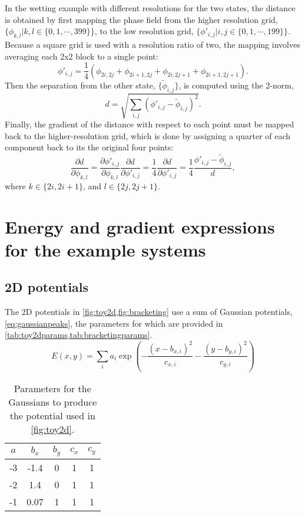 \documentclass[aip,jcp,reprint,twocolumn]{revtex4-1}
\begin{document}
In the wetting example with different resolutions for the two states, the distance is obtained by first mapping the phase field from the higher resolution grid, $\{\phi_{k,l} | k,l \in \{0,1,\cdots,399\}\}$, to the low resolution grid, $\{\phi'_{i,j} | i,j \in \{0,1,\cdots,199\}\}$.
Because a square grid is used with a resolution ratio of two, the mapping involves averaging each 2x2 block to a single point:
\begin{equation}
  \phi'_{i,j} = \frac{1}{4} \left( \phi_{2i,2j} + \phi_{2i+1,2j} + \phi_{2i,2j+1} + \phi_{2i+1,2j+1} \right).
\end{equation}
Then the separation from the other state, $\{\widetilde{\phi}_{i,j}\}$, is computed using the 2-norm,
\begin{equation}
  d = \sqrt{\sum_{i,j} \left( \phi'_{i,j} - \widetilde{\phi}_{i,j} \right)^2}.
\end{equation}
Finally, the gradient of the distance with respect to each point must be mapped back to the higher-resolution grid, which is done by assigning a quarter of each component back to its the original four points:
\begin{equation}
  \frac{\partial d}{\partial \phi_{k,l}} =
    \frac{\partial \phi'_{i,j}}{\partial \phi_{k,l}} \frac{\partial d}{\partial \phi'_{i,j}} =
    \frac{1}{4} \frac{\partial d}{\partial \phi'_{i,j}} =
    \frac{1}{4} \frac{\phi'_{i,j} - \widetilde{\phi}_{i,j}}{d},
\end{equation}
where $k \in \{2i, 2i+1\}$, and $l \in \{2j, 2j+1\}$.

\section{Energy and gradient expressions for the example systems}
\subsection{2D potentials}\label{sec:2dpotentials}
The 2D potentials in \cref{fig:toy2d,fig:bracketing} use a sum of Gaussian potentials, \cref{eq:gaussianpeaks}, the parameters for which are provided in \cref{tab:toy2dparams,tab:bracketingparams}.
\begin{equation}
  E(x,y) = \sum_i a_i \exp\!\left( - \frac{(x-b_{x,i})^2}{c_{x,i}} - \frac{(y-b_{y,i})^2}{c_{y,i}} \right)
  \label{eq:gaussianpeaks}
\end{equation}

\begin{table}[ht]
  \begin{ruledtabular}
  \begin{tabular}{ccccc}
    $a$ & $b_x$ & $b_y$ & $c_x$ & $c_y$ \\
    \hline
    -3  & -1.4  &   0   &   1   &   1   \\
    -2  &  1.4  &   0   &   1   &   1   \\
    -1  &  0.07 &   1   &   1   &   1   \\
  \end{tabular}
  \end{ruledtabular}
  \caption{\label{tab:toy2dparams}
    Parameters for the Gaussians to produce the potential used in \cref{fig:toy2d}.
  }
\end{table}
\end{document}
